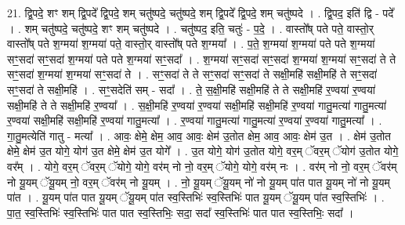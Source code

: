 \documentclass[17pt]{extarticle}
\begin{document}
21. द्वि॒पदे॒ शꣳ शम् द्वि॒पदे᳚ द्वि॒पदे॒ शम् चतु॑ष्पदे॒ चतु॑ष्पदे॒ शम् द्वि॒पदे᳚ द्वि॒पदे॒ शम् चतु॑ष्पदे । . द्वि॒पद॒ इति॑ द्वि - पदे᳚ । . शम् चतु॑ष्पदे॒ चतु॑ष्पदे॒ शꣳ शम् चतु॑ष्पदे । . चतु॑ष्पद॒ इति॒ चतुः॑ - प॒दे॒ । . वास्तो᳚ष् पते पते॒ वास्तो॒र् वास्तो᳚ष् पते श॒ग्मया॑ श॒ग्मया॑ पते॒ वास्तो॒र् वास्तो᳚ष् पते श॒ग्मया᳚ । . प॒ते॒ श॒ग्मया॑ श॒ग्मया॑ पते पते श॒ग्मया॑ सꣳ॒॒सदा॑ सꣳ॒॒सदा॑ श॒ग्मया॑ पते पते श॒ग्मया॑ सꣳ॒॒सदा᳚ । . श॒ग्मया॑ सꣳ॒॒सदा॑ सꣳ॒॒सदा॑ श॒ग्मया॑ श॒ग्मया॑ सꣳ॒॒सदा॑ ते ते सꣳ॒॒सदा॑ श॒ग्मया॑ 
श॒ग्मया॑ सꣳ॒॒सदा॑ ते । . सꣳ॒॒सदा॑ ते ते सꣳ॒॒सदा॑ सꣳ॒॒सदा॑ ते सक्षी॒महि॑ सक्षी॒महि॑ ते सꣳ॒॒सदा॑ सꣳ॒॒सदा॑ ते सक्षी॒महि॑ । . सꣳ॒॒सदेति॑ सम् - सदा᳚ । . ते॒ स॒क्षी॒महि॑ सक्षी॒महि॑ ते ते सक्षी॒महि॑ र॒ण्वया॑ र॒ण्वया॑ सक्षी॒महि॑ ते ते सक्षी॒महि॑ र॒ण्वया᳚ । . स॒क्षी॒महि॑ र॒ण्वया॑ र॒ण्वया॑ सक्षी॒महि॑ सक्षी॒महि॑ र॒ण्वया॑ गातु॒मत्या॑ गातु॒मत्या॑ र॒ण्वया॑ सक्षी॒महि॑ सक्षी॒महि॑ र॒ण्वया॑ गातु॒मत्या᳚ । . र॒ण्वया॑ गातु॒मत्या॑ गातु॒मत्या॑ र॒ण्वया॑ र॒ण्वया॑ गातु॒मत्या᳚ । . गा॒तु॒मत्येति॑ गातु - मत्या᳚ । . आवः॒ क्षेमे॒ क्षेम॒ आव॒ आवः॒ क्षेम॑ उ॒तोत क्षेम॒ आव॒ आवः॒ क्षेम॑ उ॒त । . क्षेम॑ उ॒तोत क्षेमे॒ क्षेम॑ उ॒त योगे॒ योग॑ उ॒त क्षेमे॒ क्षेम॑ उ॒त योगे᳚ । . उ॒त योगे॒ योग॑ उ॒तोत योगे॒ वर॒म् ॅवर॒म् ॅयोग॑ उ॒तोत योगे॒ वर᳚म् । . योगे॒ वर॒म् ॅवर॒म् ॅयोगे॒ योगे॒ वर॑म् नो नो॒ वर॒म् ॅयोगे॒ योगे॒ वर॑म् नः । . वर॑म् नो नो॒ वर॒म् ॅवर॑म् नो यू॒यम् ॅयू॒यम् नो॒ वर॒म् ॅवर॑म् नो यू॒यम् । . नो॒ यू॒यम् ॅयू॒यम् नो॑ नो यू॒यम् पा॑त पात यू॒यम् नो॑ नो यू॒यम् पा॑त । . यू॒यम् पा॑त पात यू॒यम् ॅयू॒यम् पा॑त स्व॒स्तिभिः॑ स्व॒स्तिभिः॑ पात यू॒यम् ॅयू॒यम् पा॑त स्व॒स्तिभिः॑ । . पा॒त॒ स्व॒स्तिभिः॑ स्व॒स्तिभिः॑ पात पात स्व॒स्तिभिः॒ सदा॒ सदा᳚ स्व॒स्तिभिः॑ पात पात स्व॒स्तिभिः॒ सदा᳚ । \newline
\end{document}
